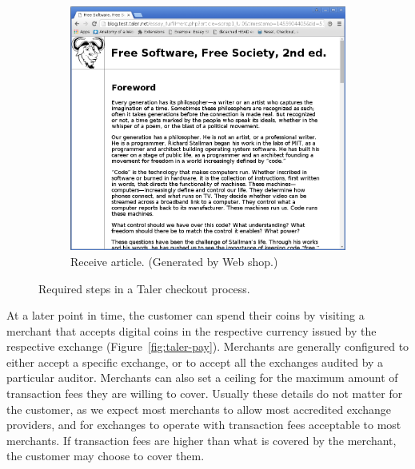 \documentclass{IEEEtran}
\begin{document}
\begin{figure}[b!]
\begin{subfigure}{0.5\textwidth}
\includegraphics[width=\textwidth]{figs/fulfillment.png}
\caption{Receive article. (Generated by Web shop.)}
\label{subfig:fulfillment}
\end{subfigure}
\caption{Required steps in a Taler checkout process.}
\label{fig:shopping}
\end{figure}


At a later point in time, the customer can spend their coins by
visiting a merchant that accepts digital coins in the respective
currency issued by the respective exchange
(Figure~\ref{fig:taler-pay}).  Merchants are generally configured to
either accept a specific exchange, or to accept all the exchanges
audited by a particular auditor.  Merchants can also set a ceiling for
the maximum amount of transaction fees they are willing to cover.
Usually these details do not matter for the customer, as we expect
most merchants to allow most accredited exchange providers, and for
exchanges to operate with transaction fees acceptable to most
merchants.  If transaction fees are higher than what is covered by the
merchant, the customer may choose to cover them.
\end{document}
